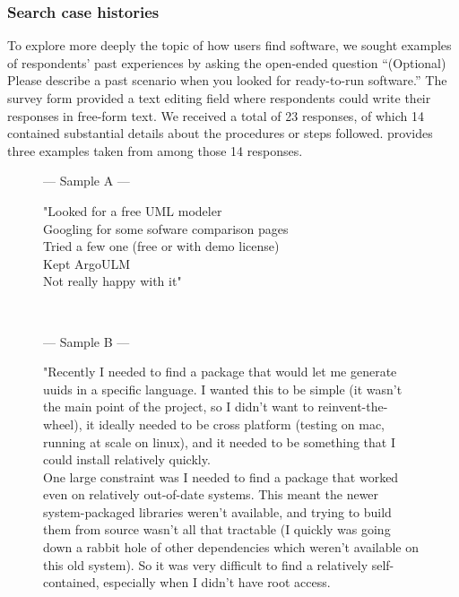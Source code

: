 \documentclass{casicswhitepaper}
\begin{document}
\subsubsection{Search case histories}

To explore more deeply the topic of how users find software, we sought examples of respondents' past experiences by asking the open-ended question ``(Optional) Please describe a past scenario when you looked for ready-to-run software.''  The survey form provided a text editing field where respondents could write their responses in free-form text.  We received a total of 23 responses, of which 14 contained substantial details about the procedures or steps followed.   provides three examples taken from among those 14 responses.

\begin{figure}[t]
  \small
  \centering
  \begin{minipage}{5.5in}
    \begin{center}
      --- Sample A ---
    \end{center}
    "Looked for a free UML modeler\\
    Googling for some sofware comparison pages\\
    Tried a few one (free or with demo license)\\
    Kept ArgoULM\\
    Not really happy with it"
  \end{minipage}\\[-0.5ex]
  \vspace*{1.5ex}
  \begin{minipage}{5.5in}
    \begin{center}
      --- Sample B ---
    \end{center}
"Recently I needed to find a package that would let me generate uuids in a specific language.  I wanted this to be simple (it wasn't the main point of the project, so I didn't want to reinvent-the-wheel), it ideally needed to be cross platform (testing on mac, running at scale on linux), and it needed to be something that I could install relatively quickly.\\

One large constraint was I needed to find a package that worked even on relatively out-of-date systems. This meant the newer system-packaged libraries weren't available, and trying to build them from source wasn't all that tractable (I quickly was going down a rabbit hole of other dependencies which weren't available on this old system).  So it was very difficult to find a relatively self-contained, especially when I didn't have root access.\\


\end{minipage}
\end{figure}
\end{document}
